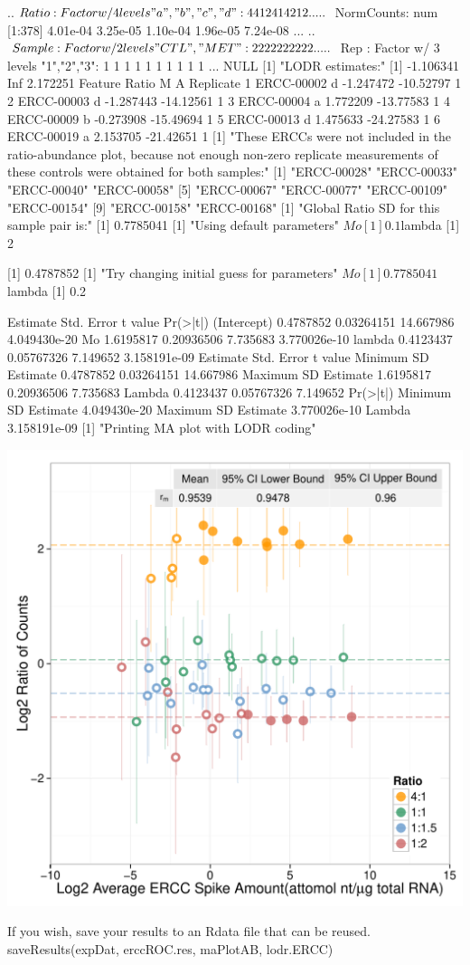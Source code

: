\documentclass{article}
\begin{document}
\begin{Schunk}
\begin{Soutput}
  ..$ Ratio     : Factor w/ 4 levels "a","b","c","d": 4 4 1 2 4 1 4 2 1 2 ...
  ..$ NormCounts: num [1:378] 4.01e-04 3.25e-05 1.10e-04 1.96e-05 7.24e-08 ...
  ..$ Sample    : Factor w/ 2 levels "CTL","MET": 2 2 2 2 2 2 2 2 2 2 ...
  ..$ Rep       : Factor w/ 3 levels "1","2","3": 1 1 1 1 1 1 1 1 1 1 ...
NULL
[1] "LODR estimates:"
[1] -1.106341       Inf  2.172251
     Feature Ratio         M         A Replicate
1 ERCC-00002     d -1.247472 -10.52797         1
2 ERCC-00003     d -1.287443 -14.12561         1
3 ERCC-00004     a  1.772209 -13.77583         1
4 ERCC-00009     b -0.273908 -15.49694         1
5 ERCC-00013     d  1.475633 -24.27583         1
6 ERCC-00019     a  2.153705 -21.42651         1
[1] "These ERCCs were not included in the ratio-abundance plot, because not enough non-zero replicate measurements of these controls were obtained for both samples:"
 [1] "ERCC-00028" "ERCC-00033" "ERCC-00040" "ERCC-00058"
 [5] "ERCC-00067" "ERCC-00077" "ERCC-00109" "ERCC-00154"
 [9] "ERCC-00158" "ERCC-00168"
[1] "Global Ratio SD for this sample pair is:"
[1] 0.7785041
[1] "Using default parameters"
$Mo
[1] 0.1

$lambda
[1] 2

[1] 0.4787852
[1] "Try changing initial guess for parameters"
$Mo
[1] 0.7785041

$lambda
[1] 0.2

             Estimate Std. Error   t value     Pr(>|t|)
(Intercept) 0.4787852 0.03264151 14.667986 4.049430e-20
Mo          1.6195817 0.20936506  7.735683 3.770026e-10
lambda      0.4123437 0.05767326  7.149652 3.158191e-09
                     Estimate Std. Error   t value
Minimum SD Estimate 0.4787852 0.03264151 14.667986
Maximum SD Estimate 1.6195817 0.20936506  7.735683
Lambda              0.4123437 0.05767326  7.149652
                        Pr(>|t|)
Minimum SD Estimate 4.049430e-20
Maximum SD Estimate 3.770026e-10
Lambda              3.158191e-09
[1] "Printing MA plot with LODR coding"
\end{Soutput}
\end{Schunk}
\includegraphics{erccdashboardVignetteTry2-018}

If you wish, save your results to an Rdata file that can be reused.
saveResults(expDat, erccROC.res, maPlotAB, lodr.ERCC)
\end{document}
